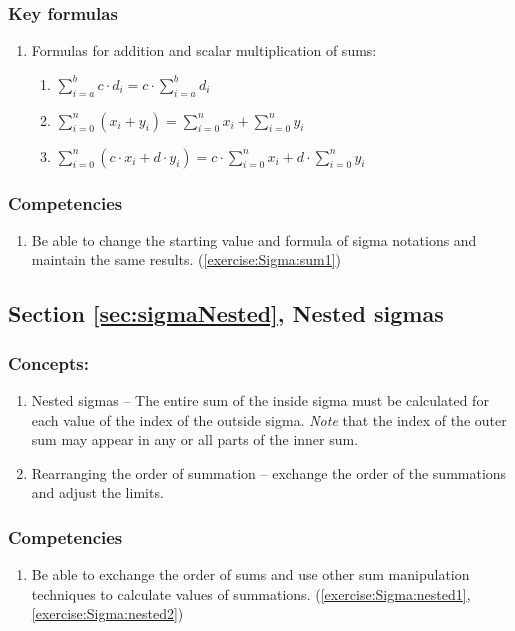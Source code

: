 \subsubsection*{Key formulas}
\begin{enumerate}
\item
Formulas for addition and scalar multiplication of sums: 
\begin{enumerate}
\item
$\displaystyle{\sum_{i=a}^{b} c \cdot d_{i} = c \cdot \sum_{i=a}^{b}  d_{i}}$
\item
$\displaystyle{\sum_{i=0}^{n} \left(x_{i} +y_{i} \right) = \sum_{i=0}^{n} x_{i} + \sum_{i=0}^{n} y_{i}}$
\item
$\displaystyle{\sum_{i=0}^{n} \left(c \cdot x_{i} + d \cdot y_{i} \right) = c \cdot \sum_{i=0}^{n} x_{i} + d \cdot \sum_{i=0}^{n} y_{i}}$
\end{enumerate}
\end{enumerate}

\subsubsection*{Competencies}
\begin{enumerate}
\item
Be able to change the starting value and formula of sigma notations and maintain the same results. (\ref{exercise:Sigma:sum1})
\end{enumerate}


\subsection*{Section \ref{sec:sigmaNested}, Nested sigmas}
\subsubsection*{Concepts:}
\begin{enumerate}
\item 
Nested sigmas -- The entire sum of the inside sigma must be calculated for each value of the index of the outside sigma. \emph{Note} that the index of the outer sum may appear in any or all parts of the inner sum.
\item
Rearranging the order of summation -- exchange the order of the summations and adjust the limits. 
\end{enumerate}

\subsubsection*{Competencies}
\begin{enumerate}
\item
Be able to exchange the order of sums and use other sum manipulation techniques to calculate values of summations. (\ref{exercise:Sigma:nested1}, \ref{exercise:Sigma:nested2})
\end{enumerate}



